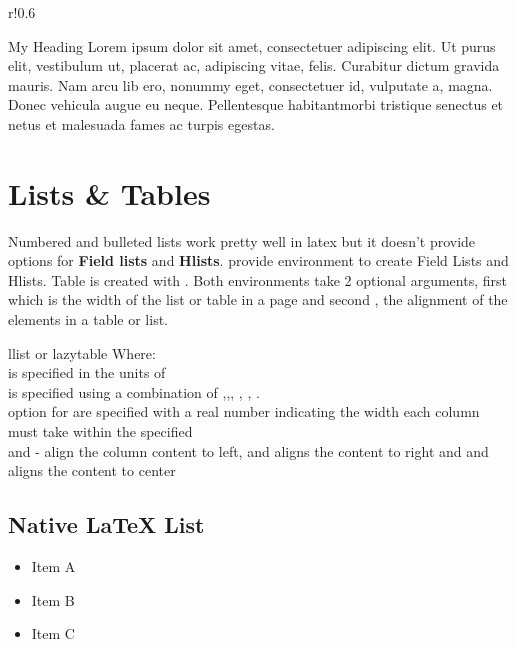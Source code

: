 \documentclass[12pt,a4paper]{report}
\begin{document}
\lipsum[1]
\begin{wrapfigure}{r!}{0.6\textwidth}
	\begin{lsidebar}{My Heading}
		Lorem ipsum dolor sit amet, consectetuer adipiscing elit. Ut purus elit, vestibulum ut, placerat ac, adipiscing vitae, felis. Curabitur dictum gravida mauris. Nam arcu lib ero, nonummy eget, consectetuer id, vulputate a, magna. Donec vehicula augue eu neque. Pellentesque habitantmorbi tristique senectus et netus et malesuada fames ac turpis egestas.
	\end{lsidebar}
\end{wrapfigure}
\lipsum[2]

\section{Lists \& Tables}
\label{listntables}
Numbered and bulleted lists work pretty well in latex but it doesn't provide options for \textbf{Field lists} and \textbf{Hlists}.  provide  environment to create Field Lists and Hlists. Table is created with . Both environments take 2 optional arguments, first  which is the width of the list or table in a page and second , the alignment of the elements in a table or list.\\
\begin{tip}[Command]
\begin{docEnvironment}%
	[doclang/environment content=content]%
	{llist or lazytable}{}
	Where:\\
	 is specified in the units of \\
	\noindent	
 	 is specified using a combination of ,,, , , .\\
 	\noindent
	 option for  are specified with a real number indicating the width each column must take within the specified \\
	\noindent
	 and  - align the column content to left,  and  aligns the content to right and  and  aligns the content to center
\end{docEnvironment}
\end{tip}
	
\subsection{Native {\LaTeX} List}
\begin{itemize}
	\item Item A
	\item Item B
	\item Item C	
\end{itemize}
\end{document}

